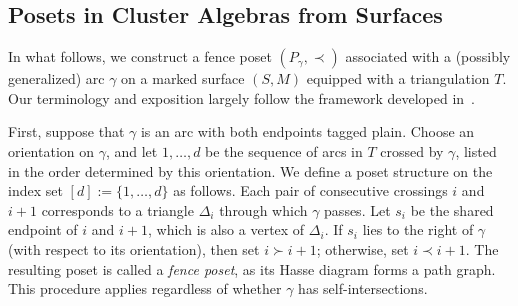 \documentclass{article}
\theoremstyle{remark}
\begin{document}
\subsection{Posets in Cluster Algebras from Surfaces}


In what follows, we construct a fence poset \( (P_{\gamma}, \prec) \) associated with a (possibly generalized) arc \( \gamma \) on a marked surface \( (S, M) \) equipped with a triangulation \( T \). Our terminology and exposition largely follow the framework developed in~\cite{banaian2024skein}.

First, suppose that \( \gamma \) is an arc with both endpoints tagged plain. Choose an orientation on \( \gamma \), and let \( 1, \ldots, d \) be the sequence of arcs in \( T \) crossed by \( \gamma \), listed in the order determined by this orientation. We define a poset structure on the index set \( [d]:=\{1,\ldots,d\} \) as follows. Each pair of consecutive crossings \( i \) and \( i+1 \) corresponds to a triangle \( \Delta_i \) through which \( \gamma \) passes. Let \( s_i \) be the shared endpoint of \( i \) and \( i+1 \), which is also a vertex of \( \Delta_i \). If \( s_i \) lies to the right of \( \gamma \) (with respect to its orientation), then set \( i \succ i+1 \); otherwise, set \( i \prec i+1 \). The resulting poset is called a \emph{fence poset}, as its Hasse diagram forms a path graph. This procedure applies regardless of whether \( \gamma \) has self-intersections.
\end{document}
